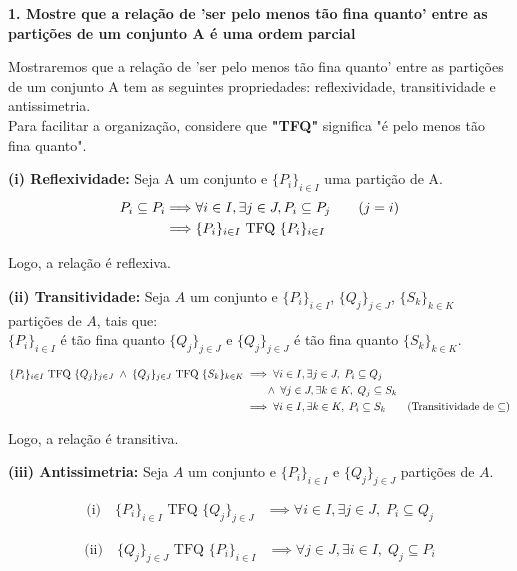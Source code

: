 \textbf{1. Mostre que a relação de 'ser pelo menos tão fina quanto' entre as partições de um conjunto A é uma ordem parcial}

Mostraremos que a relação de 'ser pelo menos tão fina quanto' entre as partições de um conjunto A tem as seguintes propriedades: reflexividade, transitividade e antissimetria.\\
Para facilitar a organização, considere que \textbf{"TFQ"} significa "é pelo menos tão fina quanto".

\textbf{(i) Reflexividade:}
Seja A um conjunto e $\{P_i\}_{i \in I}$ uma partição de A. \\
\begin{align*}
    P_i \subseteq P_i 
    &\Longrightarrow \forall i \in I, \exists j \in J, P_i \subseteq P_j \tag*{\text{($j = i$)}} \\
    &\Longrightarrow \{P_i\}_{i \in I} \text{ TFQ } \{P_i\}_{i \in I}
\end{align*}

Logo, a relação é reflexiva.

\textbf{(ii) Transitividade:}
Seja $A$ um conjunto e $\{P_i\}_{i \in I}$, $\{Q_j\}_{j \in J}$, $\{S_k\}_{k \in K}$ partições de $A$, tais que: \\
$\{P_i\}_{i \in I}$ é tão fina quanto $\{Q_j\}_{j \in J}$ e $\{Q_j\}_{j \in J}$ é tão fina quanto $\{S_k\}_{k \in K}$.

\begin{align*}
    \{P_i\}_{i \in I} \text{ TFQ } \{Q_j\}_{j \in J} \;\land\; \{Q_j\}_{j \in J} \text{ TFQ } \{S_k\}_{k \in K}
    &\implies \forall i \in I, \exists j \in J,\; P_i \subseteq Q_j \\
    &\qquad\land\; \forall j \in J, \exists k \in K,\; Q_j \subseteq S_k \\
    &\implies \forall i \in I, \exists k \in K,\; P_i \subseteq S_k \tag*{\text{(Transitividade de $\subseteq$)}}
\end{align*}

Logo, a relação é transitiva.

\textbf{(iii) Antissimetria:}
Seja $A$ um conjunto e $\{P_i\}_{i \in I}$ e $\{Q_j\}_{j \in J}$ partições de $A$.

\begin{align*}
    \text{(i)}\quad 
    \{P_i\}_{i \in I} \text{ TFQ } \{Q_j\}_{j \in J}
    &\implies \forall i \in I, \exists j \in J,\; P_i \subseteq Q_j
\end{align*}

\begin{align*}
    \text{(ii)}\quad 
    \{Q_j\}_{j \in J} \text{ TFQ } \{P_i\}_{i \in I}
    &\implies \forall j \in J, \exists i \in I,\; Q_j \subseteq P_i 
\end{align*}

